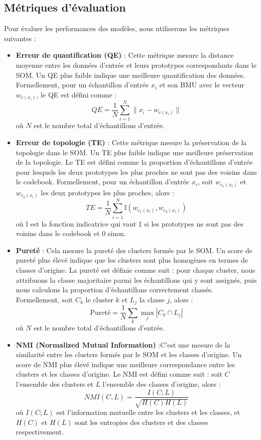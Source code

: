\documentclass[12pt,a4paper]{report}
\begin{document}
\subsection{Métriques d'évaluation}
Pour évaluer les performances des modèles, nous utiliserons les métriques suivantes :
\begin{itemize}
    \item \textbf{Erreur de quantification (QE)} : Cette métrique mesure la distance moyenne entre les données d'entrée et leurs prototypes correspondants dans le SOM. 
    Un QE plus faible indique une meilleure quantification des données. Formellement, pour un échantillon d'entrée $x_i$ et son BMU avec le vecteur $w_{c(x_i)}$, le QE est défini comme :
    $$ QE = \frac{1}{N} \sum_{i=1}^{N} \| x_i - w_{c(x_i)} \| $$
    où $N$ est le nombre total d'échantillons d'entrée.

    \item \textbf{Erreur de topologie (TE)} : Cette métrique mesure la préservation de la topologie dans le SOM. 
    Un TE plus faible indique une meilleure préservation de la topologie. Le TE est défini comme la proportion d'échantillons d'entrée pour lesquels les deux prototypes les plus proches ne sont pas des voisins dans le codebook.
    Formellement, pour un échantillon d'entrée $x_i$, soit $w_{c_1(x_i)}$ et $w_{c_2(x_i)}$ les deux prototypes les plus proches, alors :
    $$ TE = \frac{1}{N} \sum_{i=1}^{N} \mathbb{I}(w_{c_1(x_i)}, w_{c_2(x_i)}) $$
    où $\mathbb{I}$ est la fonction indicatrice qui vaut 1 si les prototypes ne sont pas des voisins dans le codebook et 0 sinon.

    \item \textbf{Pureté} : Cela mesure la pureté des clusters formés par le SOM. Un score de pureté plus élevé indique que les clusters sont plus homogènes en termes de classes d'origine.
    La pureté est définie comme suit : pour chaque cluster, nous attribuons la classe majoritaire parmi les échantillons qui y sont assignés, 
    puis nous calculons la proportion d'échantillons correctement classés. Formellement, soit $C_k$ le cluster $k$ et $L_j$ la classe $j$, alors :
    $$ \text{Pureté} = \frac{1}{N} \sum_{k} \max_j |C_k \cap L_j| $$
    où $N$ est le nombre total d'échantillons d'entrée.
    \item \textbf{NMI (Normalized Mutual Information)} :C'est une mesure de la similarité entre les clusters formés par le SOM et les classes d'origine. 
    Un score de NMI plus élevé indique une meilleure correspondance entre les clusters et les classes d'origine. Le NMI est défini comme suit : 
    soit $C$ l'ensemble des clusters et $L$ l'ensemble des classes d'origine, alors :
    $$ NMI(C, L) = \frac{I(C; L)}{\sqrt{H(C) H(L)}} $$
    où $I(C; L)$ est l'information mutuelle entre les clusters et les classes, et $H(C)$ et $H(L)$ sont les entropies des clusters et des classes respectivement.
\end{itemize}
\end{document}
